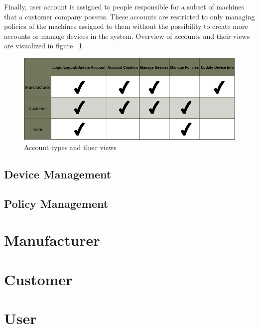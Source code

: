 Finally, user account is assigned to people responsible for a subset of machines that a customer company possess. These accounts are restricted to only managing policies of the machines assigned to them without the possibility to create more accounts or manage devices in the system. Overview of accounts and their views are visualized in figure ~\ref{fig:accountTypes}.

\begin{figure}[ht]
	\begin{center}
		\includegraphics[width=\textwidth]{images/Functionalities}
		\caption{Account types and their views}
		\label{fig:accountTypes}
	\end{center}
\end{figure}

\subsection{Device Management}
\label{deviceManagement}

\subsection{Policy Management}
\label{policyManagement}

\section{Manufacturer}
\label{Manufacturer}

\section{Customer}

\section{User}

